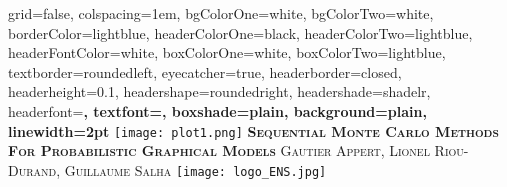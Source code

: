 \documentclass[portrait,final,a0paper,fontscale=0.277]{baposter}
\begin{document}
\begin{poster}%
  {
  grid=false,
  colspacing=1em,
  bgColorOne=white,
  bgColorTwo=white,
  borderColor=lightblue,
  headerColorOne=black,
  headerColorTwo=lightblue,
  headerFontColor=white,
  boxColorOne=white,
  boxColorTwo=lightblue,
  textborder=roundedleft,
  eyecatcher=true,
  headerborder=closed,
  headerheight=0.1\textheight,
  headershape=roundedright,
  headershade=shadelr,
  headerfont=\Large\bf\textsc, %
  textfont={\setlength{\parindent}{1.5em}},
  boxshade=plain,
  background=plain,
  linewidth=2pt
  }
  {\texttt{[image: plot1.png]}} 
  {\bf\textsc{Sequential Monte Carlo Methods For Probabilistic Graphical Models}\vspace{0.5em}}
  {\textsc{Gautier Appert, Lionel Riou-Durand, Guillaume Salha}}
  {%
    \texttt{[image: logo\_ENS.jpg]}
  }

    \newcommand{\colouredcircle}{%
      \tikz{\useasboundingbox (-0.2em,-0.32em) rectangle(0.2em,0.32em); \draw[draw=black,fill=lightblue,line width=0.03em] (0,0) circle(0.18em);}}





\end{poster}
\end{document}
